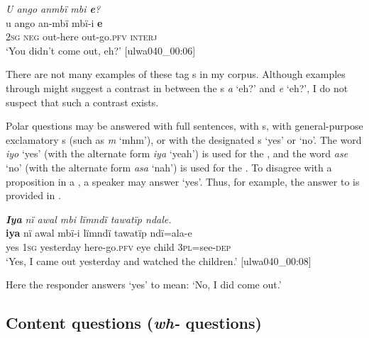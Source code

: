 \ea%
    \label{ex:syntax:7}
            \textit{U ango anmbï mbi \textbf{e}?}\\
\gll u    ango  an-mbï    mbï-i    \textbf{e}\\
    2\textsc{sg}  \textsc{neg}  out-here  out-go.\textsc{pfv}  \textsc{interj}\\
\glt `You didn’t come out, eh?’ [ulwa040\_00:06]
\z

There are not many examples of these tag s in my corpus. Although examples  through  might suggest a contrast in  between the s \textit{a} ‘eh?’ and \textit{e} ‘eh?’, I do not suspect that such a contrast exists.

  Polar questions may be answered with full sentences, with s, with general-purpose  exclamatory s (such as \textit{m} ‘mhm’), or with the designated  s ‘yes’ or ‘no’. The word \textit{iyo} ‘yes’ (with the alternate form \textit{iya} ‘yeah’) is used for the , and the word \textit{ase} ‘no’ (with the alternate form \textit{asa} ‘nah’) is used for the . To disagree with a  proposition in a , a speaker may answer ‘yes’. Thus, for example, the answer to  is provided in .

\ea%
    \label{ex:syntax:8}
            \textbf{\textit{Iya}} \textit{nï awal mbi lïmndï tawatïp ndale.}\\
\gll    \textbf{iya}  nï    awal    mbï-i      lïmndï  tawatïp    ndï=ala-e\\
    yes  1\textsc{sg}  yesterday  here-go.\textsc{pfv}  eye    child    \textsc{3pl}=see-\textsc{dep}\\
\glt `Yes, I came out yesterday and watched the children.’ [ulwa040\_00:08]
\z

Here the responder answers ‘yes’ to mean: ‘No, I did come out.’


\subsection{{Content} {questions} {(\textit{wh-}} {questions)}}\label{sec:13.1.2}



